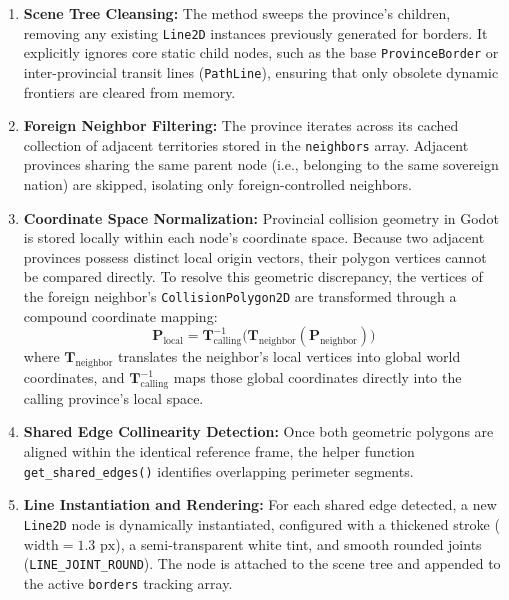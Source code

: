 \begin{enumerate}
    \item \textbf{Scene Tree Cleansing:} The method sweeps the province's children, removing any existing \texttt{Line2D} instances previously generated for borders. It explicitly ignores core static child nodes, such as the base \texttt{ProvinceBorder} or inter-provincial transit lines (\texttt{PathLine}), ensuring that only obsolete dynamic frontiers are cleared from memory.
    \item \textbf{Foreign Neighbor Filtering:} The province iterates across its cached collection of adjacent territories stored in the \texttt{neighbors} array. Adjacent provinces sharing the same parent node (i.e., belonging to the same sovereign nation) are skipped, isolating only foreign-controlled neighbors.
    \item \textbf{Coordinate Space Normalization:} Provincial collision geometry in Godot is stored locally within each node's coordinate space. Because two adjacent provinces possess distinct local origin vectors, their polygon vertices cannot be compared directly. To resolve this geometric discrepancy, the vertices of the foreign neighbor's \texttt{CollisionPolygon2D} are transformed through a compound coordinate mapping:
    \begin{equation}
        \mathbf{P}_{\text{local}} = \mathbf{T}_{\text{calling}}^{-1} \Big( \mathbf{T}_{\text{neighbor}} ( \mathbf{P}_{\text{neighbor}} ) \Big)
    \end{equation}
    where $\mathbf{T}_{\text{neighbor}}$ translates the neighbor's local vertices into global world coordinates, and $\mathbf{T}_{\text{calling}}^{-1}$ maps those global coordinates directly into the calling province's local space.
    \item \textbf{Shared Edge Collinearity Detection:} Once both geometric polygons are aligned within the identical reference frame, the helper function \texttt{get\_shared\_edges()} identifies overlapping perimeter segments.
    \item \textbf{Line Instantiation and Rendering:} For each shared edge detected, a new \texttt{Line2D} node is dynamically instantiated, configured with a thickened stroke ($\text{width} = 1.3\text{ px}$), a semi-transparent white tint, and smooth rounded joints (\texttt{LINE\_JOINT\_ROUND}). The node is attached to the scene tree and appended to the active \texttt{borders} tracking array.
\end{enumerate}

